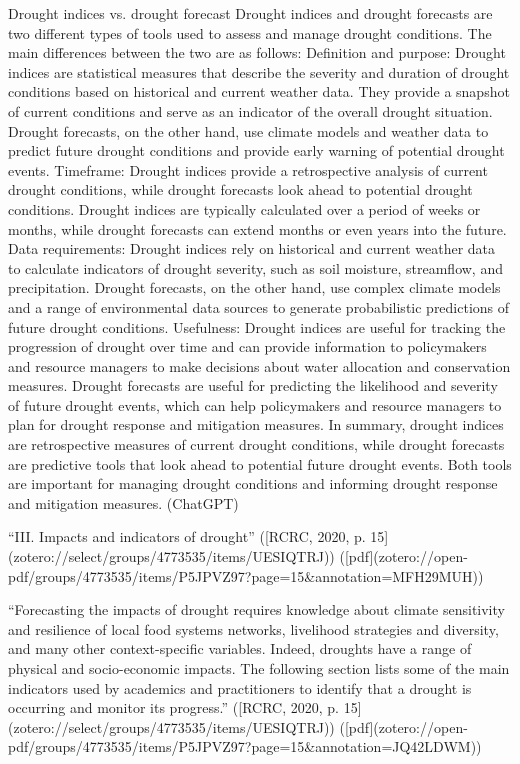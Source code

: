 {Drought indices vs. drought forecast
Drought indices and drought forecasts are two different types of tools used to assess and manage drought conditions. The main differences between the two are as follows:
Definition and purpose: Drought indices are statistical measures that describe the severity and duration of drought conditions based on historical and current weather data. They provide a snapshot of current conditions and serve as an indicator of the overall drought situation. Drought forecasts, on the other hand, use climate models and weather data to predict future drought conditions and provide early warning of potential drought events.
Timeframe: Drought indices provide a retrospective analysis of current drought conditions, while drought forecasts look ahead to potential drought conditions. Drought indices are typically calculated over a period of weeks or months, while drought forecasts can extend months or even years into the future.
Data requirements: Drought indices rely on historical and current weather data to calculate indicators of drought severity, such as soil moisture, streamflow, and precipitation. Drought forecasts, on the other hand, use complex climate models and a range of environmental data sources to generate probabilistic predictions of future drought conditions.
Usefulness: Drought indices are useful for tracking the progression of drought over time and can provide information to policymakers and resource managers to make decisions about water allocation and conservation measures. Drought forecasts are useful for predicting the likelihood and severity of future drought events, which can help policymakers and resource managers to plan for drought response and mitigation measures.
In summary, drought indices are retrospective measures of current drought conditions, while drought forecasts are predictive tools that look ahead to potential future drought events. Both tools are important for managing drought conditions and informing drought response and mitigation measures. (ChatGPT)


“III. Impacts and indicators of drought” ([RCRC, 2020, p. 15](zotero://select/groups/4773535/items/UESIQTRJ)) ([pdf](zotero://open-pdf/groups/4773535/items/P5JPVZ97?page=15&annotation=MFH29MUH))

“Forecasting the impacts of drought requires knowledge about climate sensitivity and resilience of local food systems networks, livelihood strategies and diversity, and many other context-specific variables. Indeed, droughts have a range of physical and socio-economic impacts. The following section lists some of the main indicators used by academics and practitioners to identify that a drought is occurring and monitor its progress.” ([RCRC, 2020, p. 15](zotero://select/groups/4773535/items/UESIQTRJ)) ([pdf](zotero://open-pdf/groups/4773535/items/P5JPVZ97?page=15&annotation=JQ42LDWM))


}
